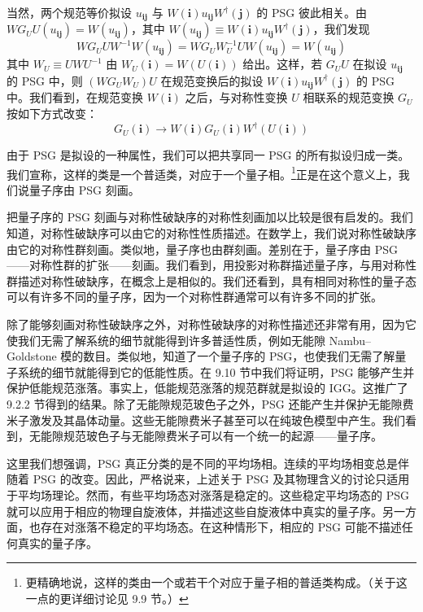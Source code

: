 当然，两个规范等价拟设 $u_{\pmb{i}\pmb{j}}$ 与 $W(\pmb{i})u_{\pmb{i}\pmb{j}}W^{\dagger}(\pmb{j})$ 的 PSG 彼此相关。由 $WG_UU(u_{\pmb{i}\pmb{j}})=W(u_{\pmb{i}\pmb{j}})$，其中 $W(u_{\pmb{i}\pmb{j}})\equiv W(\pmb{i})u_{\pmb{i}\pmb{j}}W^{\dagger}(\pmb{j})$，我们发现
\begin{equation*}
WG_UUW^{-1}W(u_{\pmb{i}\pmb{j}})=WG_UW_U^{-1}UW(u_{\pmb{i}\pmb{j}})=W(u_{\pmb{i}\pmb{j}})
\end{equation*}
其中 $W_U\equiv UWU^{-1}$ 由 $W_U(\pmb{i})=W(U(\pmb{i}))$ 给出。这样，若 $G_UU$ 在拟设 $u_{\pmb{i}\pmb{j}}$ 的 PSG 中，则 $(WG_UW_U)U$ 在规范变换后的拟设 $W(\pmb{i})u_{\pmb{i}\pmb{j}}W^{\dagger}(\pmb{j})$ 的 PSG 中。我们看到，在规范变换 $W(\pmb{i})$ 之后，与对称性变换 $U$ 相联系的规范变换 $G_U$ 按如下方式改变：
\begin{equation*}
G_U(\pmb{i})\to W(\pmb{i})G_U(\pmb{i})W^{\dagger}(U(\pmb{i}))
\tag{9.4.3}
\end{equation*}

由于 PSG 是拟设的一种属性，我们可以把共享同一 PSG 的所有拟设归成一类。我们宣称，这样的类是一个普适类，对应于一个量子相。\footnote{更精确地说，这样的类由一个或若干个对应于量子相的普适类构成。（关于这一点的更详细讨论见 9.9 节。）}正是在这个意义上，我们说量子序由 PSG 刻画。

把量子序的 PSG 刻画与对称性破缺序的对称性刻画加以比较是很有启发的。我们知道，对称性破缺序可以由它的对称性性质描述。在数学上，我们说对称性破缺序由它的对称性群刻画。类似地，量子序也由群刻画。差别在于，量子序由 PSG——对称性群的扩张——刻画。我们看到，用投影对称群描述量子序，与用对称性群描述对称性破缺序，在概念上是相似的。我们还看到，具有相同对称性的量子态可以有许多不同的量子序，因为一个对称性群通常可以有许多不同的扩张。

除了能够刻画对称性破缺序之外，对称性破缺序的对称性描述还非常有用，因为它使我们无需了解系统的细节就能得到许多普适性质，例如无能隙 Nambu--Goldstone 模的数目。类似地，知道了一个量子序的 PSG，也使我们无需了解量子系统的细节就能得到它的低能性质。在 9.10 节中我们将证明，PSG 能够产生并保护低能规范涨落。事实上，低能规范涨落的规范群就是拟设的 IGG。这推广了 9.2.2 节得到的结果。除了无能隙规范玻色子之外，PSG 还能产生并保护无能隙费米子激发及其晶体动量。这些无能隙费米子甚至可以在纯玻色模型中产生。我们看到，无能隙规范玻色子与无能隙费米子可以有一个统一的起源——量子序。

这里我们想强调，PSG 真正分类的是不同的平均场相。连续的平均场相变总是伴随着 PSG 的改变。因此，严格说来，上述关于 PSG 及其物理含义的讨论只适用于平均场理论。然而，有些平均场态对涨落是稳定的。这些稳定平均场态的 PSG 就可以应用于相应的物理自旋液体，并描述这些自旋液体中真实的量子序。另一方面，也存在对涨落不稳定的平均场态。在这种情形下，相应的 PSG 可能不描述任何真实的量子序。

